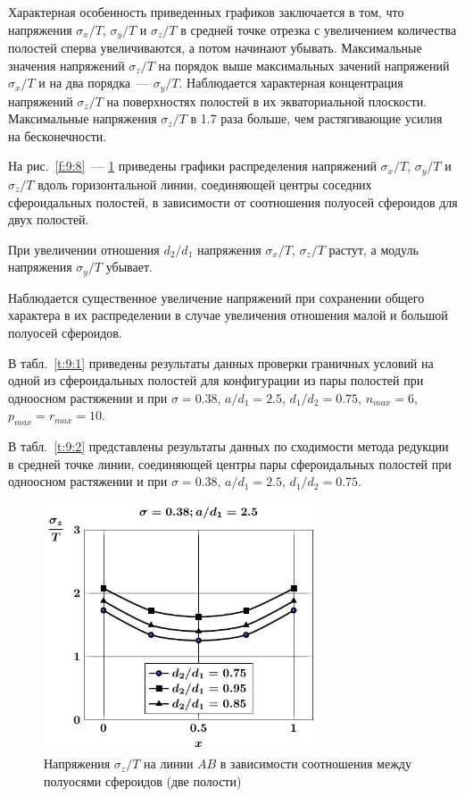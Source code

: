 Характерная особенность приведенных графиков заключается в том, что напряжения $\sigma_x/T$, $\sigma_y/T$ и $\sigma_z/T$ в средней точке отрезка с увеличением количества полостей сперва увеличиваются, а потом начинают убывать. Максимальные значения напряжений $\sigma_z/T$ на порядок выше максимальных зачений напряжений $\sigma_x/T$ и на два порядка~--- $\sigma_y/T$. Наблюдается характерная концентрация напряжений $\sigma_z/T$ на поверхностях полостей в их экваториальной плоскости. Максимальные напряжения $\sigma_z/T$ в 1.7 раза больше, чем растягивающие усилия на бесконечности.

На рис.~\ref{f:9:8}~--- \ref{f:9:10} приведены графики распределения напряжений $\sigma_x/T$, $\sigma_y/T$ и $\sigma_z/T$ вдоль горизонтальной  линии, соединяющей центры соседних сфероидальных полостей, в зависимости от соотношения полуосей сфероидов для двух полостей.

При увеличении отношения $d_2/d_1$ напряжения $\sigma_x/T$, $\sigma_z/T$ растут, а модуль напряжения $\sigma_y/T$ убывает.

Наблюдается существенное увеличение напряжений при сохранении общего характера в их распределении в случае увеличения отношения малой и большой полуосей сфероидов.

В табл.~\ref{t:9:1} приведены результаты данных проверки граничных условий на одной из сфероидальных полостей для конфигурации из пары полостей при одноосном растяжении и при $\sigma=0.38$, $a/d_1=2.5$, $d_1/d_2=0.75$, $n_{max}=6$, $p_{max}=r_{max}=10$.

В табл.~\ref{t:9:2} представлены результаты данных по сходимости метода редукции в средней точке линии, соединяющей центры пары сфероидальных полостей при одноосном растяжении и при $\sigma=0.38$, $a/d_1=2.5$, $d_1/d_2=0.75$.

\begin{figure}
\centering
\includegraphics[width=8cm]{cav2-d-sig_z.pdf}
\caption{Напряжения $\sigma_z/T$ на линии $AB$ в зависимости соотношения между полуосями сфероидов (две полости)}
\label{f:9:10}
\end{figure}

